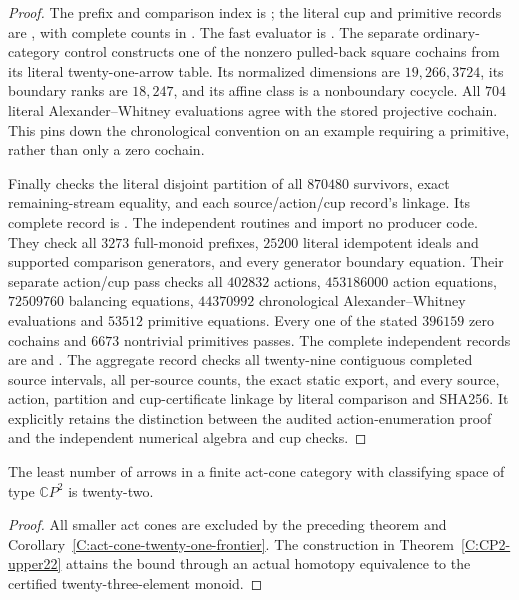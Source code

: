 \begin{proof}
The prefix and comparison index is
;
the literal cup and primitive records are
,
with complete counts in
.
The fast evaluator is .
The separate ordinary-category control
constructs one of the nonzero pulled-back square cochains from
its literal twenty-one-arrow table.  Its normalized dimensions
are $19,266,3724$, its boundary ranks are $18,247$, and its
affine class is a nonboundary cocycle.  All $704$ literal
Alexander--Whitney evaluations agree with the stored projective
cochain.  This pins down the chronological convention on an
example requiring a primitive, rather than only a zero cochain.

Finally  checks the
literal disjoint partition of all $870480$ survivors, exact
remaining-stream equality, and each source/action/cup record's
linkage.  Its complete record is
.
The independent routines
 and
 import no producer code.
They check all $3273$ full-monoid prefixes, $25200$ literal
idempotent ideals and supported comparison generators, and every
generator boundary equation.  Their separate action/cup pass
checks all $402832$ actions, $453186000$ action equations,
$72509760$ balancing equations, $44370992$ chronological
Alexander--Whitney evaluations and $53512$ primitive equations.
Every one of the stated $396159$ zero cochains and $6673$
nontrivial primitives passes.  The complete independent records are
 and
.
The aggregate record
checks all twenty-nine contiguous completed source intervals,
all per-source counts, the exact static export, and every source,
action, partition and cup-certificate linkage by literal comparison
and SHA256.  It explicitly retains the distinction between the
audited action-enumeration proof and the independent numerical
algebra and cup checks.
\end{proof}

\begin{corollary}
\label{C:act-cone-minimum-twenty-two}
The least number of arrows in a finite act-cone category with
classifying space of type $\mathbb CP^2$ is twenty-two.
\end{corollary}
\begin{proof}
All smaller act cones are excluded by the preceding theorem and
Corollary~\ref{C:act-cone-twenty-one-frontier}.
The construction in Theorem~\ref{C:CP2-upper22} attains the bound
through an actual homotopy equivalence to the certified
twenty-three-element monoid.
\end{proof}

